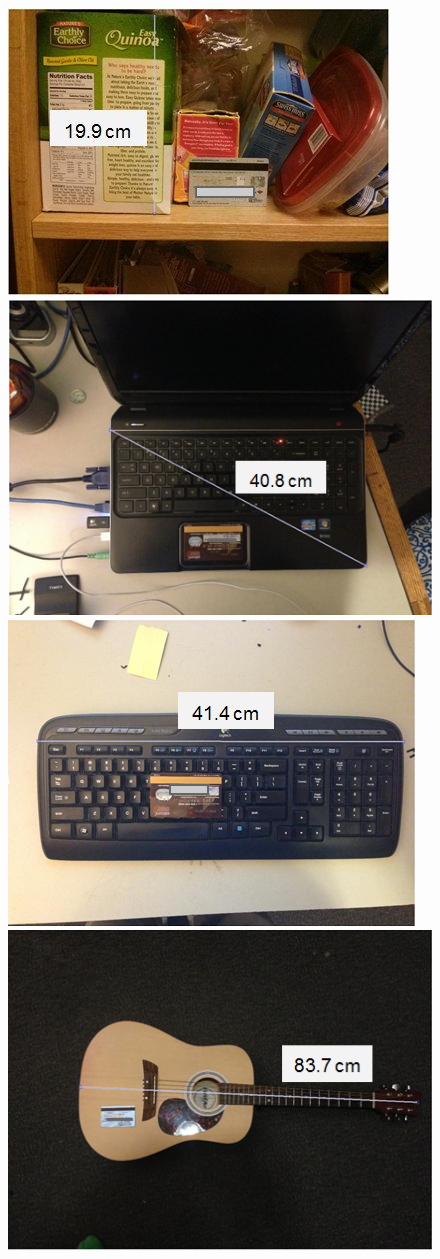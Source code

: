 \documentclass[10pt,twocolumn,letterpaper]{article}
\begin{document}
\begin{figure}[t]
\begin{center}
   \includegraphics[width=0.8\linewidth]{measure1}
   \includegraphics[width=0.8\linewidth]{measure2}
   \includegraphics[width=0.8\linewidth]{measure3}
   \includegraphics[width=0.8\linewidth]{measure4}

\end{center}
\end{figure}
\end{document}
